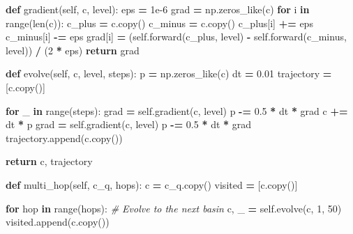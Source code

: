 \documentclass[
  11pt,
  a4paper,
]{article}
\newenvironment{Shaded}{\begin{snugshade}}{\end{snugshade}}
\newcommand{\BuiltInTok}[1]{#1}
\newcommand{\CommentTok}[1]{\textcolor[rgb]{0.56,0.35,0.01}{\textit{#1}}}
\newcommand{\ControlFlowTok}[1]{\textcolor[rgb]{0.13,0.29,0.53}{\textbf{#1}}}
\newcommand{\DecValTok}[1]{\textcolor[rgb]{0.00,0.00,0.81}{#1}}
\newcommand{\FloatTok}[1]{\textcolor[rgb]{0.00,0.00,0.81}{#1}}
\newcommand{\KeywordTok}[1]{\textcolor[rgb]{0.13,0.29,0.53}{\textbf{#1}}}
\newcommand{\NormalTok}[1]{#1}
\newcommand{\OperatorTok}[1]{\textcolor[rgb]{0.81,0.36,0.00}{\textbf{#1}}}
\newcommand{\VariableTok}[1]{\textcolor[rgb]{0.00,0.00,0.00}{#1}}
\begin{document}
\begin{Shaded}
\begin{Highlighting}[]
    \KeywordTok{def}\NormalTok{ gradient(}\VariableTok{self}\NormalTok{, c, level):}
\NormalTok{        eps }\OperatorTok{=} \FloatTok{1e{-}6}
\NormalTok{        grad }\OperatorTok{=}\NormalTok{ np.zeros\_like(c)}
        \ControlFlowTok{for}\NormalTok{ i }\KeywordTok{in} \BuiltInTok{range}\NormalTok{(}\BuiltInTok{len}\NormalTok{(c)):}
\NormalTok{            c\_plus }\OperatorTok{=}\NormalTok{ c.copy()}
\NormalTok{            c\_minus }\OperatorTok{=}\NormalTok{ c.copy()}
\NormalTok{            c\_plus[i] }\OperatorTok{+=}\NormalTok{ eps}
\NormalTok{            c\_minus[i] }\OperatorTok{{-}=}\NormalTok{ eps}
\NormalTok{            grad[i] }\OperatorTok{=}\NormalTok{ (}\VariableTok{self}\NormalTok{.forward(c\_plus, level) }\OperatorTok{{-}} \VariableTok{self}\NormalTok{.forward(c\_minus, level)) }\OperatorTok{/}\NormalTok{ (}\DecValTok{2} \OperatorTok{*}\NormalTok{ eps)}
        \ControlFlowTok{return}\NormalTok{ grad}
    
    \KeywordTok{def}\NormalTok{ evolve(}\VariableTok{self}\NormalTok{, c, level, steps):}
\NormalTok{        p }\OperatorTok{=}\NormalTok{ np.zeros\_like(c)}
\NormalTok{        dt }\OperatorTok{=} \FloatTok{0.01}
\NormalTok{        trajectory }\OperatorTok{=}\NormalTok{ [c.copy()]}
        
        \ControlFlowTok{for}\NormalTok{ \_ }\KeywordTok{in} \BuiltInTok{range}\NormalTok{(steps):}
\NormalTok{            grad }\OperatorTok{=} \VariableTok{self}\NormalTok{.gradient(c, level)}
\NormalTok{            p }\OperatorTok{{-}=} \FloatTok{0.5} \OperatorTok{*}\NormalTok{ dt }\OperatorTok{*}\NormalTok{ grad}
\NormalTok{            c }\OperatorTok{+=}\NormalTok{ dt }\OperatorTok{*}\NormalTok{ p}
\NormalTok{            grad }\OperatorTok{=} \VariableTok{self}\NormalTok{.gradient(c, level)}
\NormalTok{            p }\OperatorTok{{-}=} \FloatTok{0.5} \OperatorTok{*}\NormalTok{ dt }\OperatorTok{*}\NormalTok{ grad}
\NormalTok{            trajectory.append(c.copy())}
        
        \ControlFlowTok{return}\NormalTok{ c, trajectory}
    
    \KeywordTok{def}\NormalTok{ multi\_hop(}\VariableTok{self}\NormalTok{, c\_q, hops):}
\NormalTok{        c }\OperatorTok{=}\NormalTok{ c\_q.copy()}
\NormalTok{        visited }\OperatorTok{=}\NormalTok{ [c.copy()]}
        
        \ControlFlowTok{for}\NormalTok{ hop }\KeywordTok{in} \BuiltInTok{range}\NormalTok{(hops):}
            \CommentTok{\# Evolve to the next basin}
\NormalTok{            c, \_ }\OperatorTok{=} \VariableTok{self}\NormalTok{.evolve(c, }\DecValTok{1}\NormalTok{, }\DecValTok{50}\NormalTok{)}
\NormalTok{            visited.append(c.copy())}
            

\end{Highlighting}
\end{Shaded}
\end{document}
